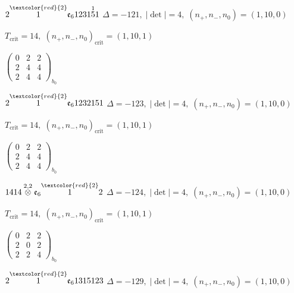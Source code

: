 \documentclass[10pt]{article}
\begin{document}
\smallskip

$2\overset{\textcolor{red}{2}}{1}\mathfrak{e}_61231\overset{1}{5}1$ \quad $\Delta=-121,\; |\det|=4,\; (n_+,n_-,n_0)=(1,10,0)$

\hspace{1em}$T_{\text{crit}}=14,\; (n_+,n_-,n_0)_{\text{crit}}=(1,10,1)$

\hspace{2em}$\left(\begin{smallmatrix}0 & 2 & 2 \\ 2 & 4 & 4 \\ 2 & 4 & 4\end{smallmatrix}\right)_{\!b_0}$

\smallskip

$2\overset{\textcolor{red}{2}}{1}\mathfrak{e}_61232151$ \quad $\Delta=-123,\; |\det|=4,\; (n_+,n_-,n_0)=(1,10,0)$

\hspace{1em}$T_{\text{crit}}=14,\; (n_+,n_-,n_0)_{\text{crit}}=(1,10,1)$

\hspace{2em}$\left(\begin{smallmatrix}0 & 2 & 2 \\ 2 & 4 & 4 \\ 2 & 4 & 4\end{smallmatrix}\right)_{\!b_0}$

\smallskip

$1414\overset{2,2}{\otimes}\mathfrak{e}_6\overset{\textcolor{red}{2}}{1}2$ \quad $\Delta=-124,\; |\det|=4,\; (n_+,n_-,n_0)=(1,10,0)$

\hspace{1em}$T_{\text{crit}}=14,\; (n_+,n_-,n_0)_{\text{crit}}=(1,10,1)$

\hspace{2em}$\left(\begin{smallmatrix}0 & 2 & 2 \\ 2 & 0 & 2 \\ 2 & 2 & 4\end{smallmatrix}\right)_{\!b_0}$

\smallskip

$2\overset{\textcolor{red}{2}}{1}\mathfrak{e}_61315123$ \quad $\Delta=-129,\; |\det|=4,\; (n_+,n_-,n_0)=(1,10,0)$
\end{document}
